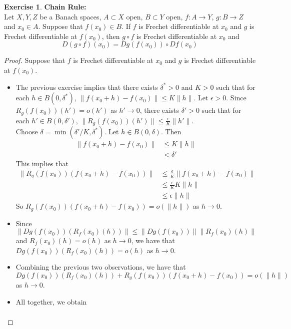 \documentclass[12pt]{amsart}
\theoremstyle{definition}
\newtheorem{ex}[definition]{Exercise}
\newcommand{\del}{\delta}
\newcommand{\ep}{\epsilon}
\newcommand{\lex}[1]{\label{ex:#1}}
\begin{document}
	\begin{ex} \lex{62009}\textbf{Chain Rule:}\\
	Let $X, Y, Z$ be a Banach spaces, $A \subset X$ open, $B \subset Y$ open, $f:A \rightarrow Y$, $g:B \rightarrow Z$ and $x_0 \in A$. Suppose that $f(x_0) \in B$. If $f$ is Frechet differentiable at $x_0$ and $g$ is Frechet differentiable at $f(x_0)$, then $g \circ f$ is Frechet differentiable at $x_0$ and $$D(g \circ f)(x_0) = Dg(f(x_0)) \circ Df(x_0)$$
	\end{ex}
	
	\begin{proof}
	Suppose that $f$ is Frechet differentiable at $x_0$ and $g$ is Frechet differentiable at $f(x_0)$. 
	
	\begin{itemize}
	\item The previous exercise implies that there exists $\del^* >0$ and $K > 0$ such that for each $h \in B(0, \del^*)$, $\| f(x_0 + h) - f(x_0) \| \leq K \|h\|$. Let $\ep >0$. Since $R_g(f(x_0))(h') = o(h')$ as $h' \rightarrow 0$, there exists $\del' >0$ such that for each $h' \in B(0, \del')$, $\|R_g(f(x_0))(h')\| \leq \frac{\ep}{K} \|h'\|$. \\ Choose $\del = \min(\del' / K, \del^*)$. Let $h \in B(0, \del)$. Then 
	\begin{align*}
	\| f(x_0 + h) - f(x_0) \| 
	& \leq K \|h\| \\
	&< \del' 
	\end{align*}
	This implies that 
	\begin{align*}
	\|R_g(f(x_0))(f(x_0 + h) - f(x_0))\| 
	& \leq \frac{\ep}{K} \|f(x_0 + h) - f(x_0)\| \\
	& \leq \frac{\ep}{K} K\|h\| \\
	& \leq \ep \|h\|
	\end{align*}
	So $R_g(f(x_0))(f(x_0 + h) - f(x_0)) = o(\|h\|)$ as $h \rightarrow 0$. \\
	\item Since $\|Dg(f(x_0))(R_f(x_0)(h))\| \leq \|Dg(f(x_0)) \| \|R_f(x_0)(h)\|$ and $R_f(x_0)(h) = o(h)$ as $h \rightarrow 0$, we have that $Dg(f(x_0))(R_f(x_0)(h)) = o(h)$ as $h \rightarrow 0$. \\
	\item Combining the previous two observations, we have that $Dg(f(x_0))(R_f(x_0)(h)) + R_g(f(x_0))(f(x_0 + h) - f(x_0)) = o(\|h\|)$ as $h \rightarrow 0$. \\
	\item All together, we obtain 
	\begin{align*}

\end{align*}
\end{itemize}
\end{proof}
\end{document}
